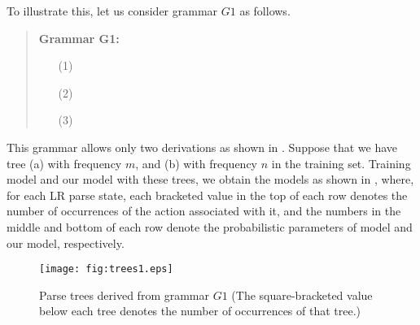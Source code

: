 \documentclass[a4j]{article}
\def\BC{}
\def\fig#1{}
\def\tbl#1{}
\begin{document}
To illustrate this, let us consider grammar $G1$ as follows.
\begin{quote}
{\bf Grammar G1:}
  \begin{itemize}\itemsep=0mm
  \item[(1)]
  \item[(2)]
  \item[(3)]
  \end{itemize}
\end{quote}
This grammar allows only two derivations as shown in
\fig{trees1}. Suppose that we have tree (a) with frequency $m$, and (b)
with frequency $n$ in the training set. Training \BC model and our model
with these trees, we obtain the models as shown in \tbl{LR-table1},
where, for each LR parse state, each bracketed value in the top of each
row denotes the number of occurrences of the action associated with it,
and the numbers in the middle and bottom of each row denote the
probabilistic parameters of \BC model and our model, respectively.
\begin{figure}[t]
  \begin{center}
    \leavevmode
    \texttt{[image: fig:trees1.eps]}
    \caption{Parse trees derived from grammar $G1$ (The square-bracketed 
      value below each tree denotes the number of occurrences of that
      tree.)}
    \label{fig:trees1}
  \end{center}
\end{figure}
\begin{table}[t]
  \begin{center}
    \leavevmode
    \caption{LR table for grammar $G1$, with trained parameters (The
      numbers given in the middle and bottom of each row denote the
      parameters for \BC model and our model, respectively.)}
    \label{tbl:LR-table1}
    \small
    
  \end{center}
\end{table}
\end{document}
